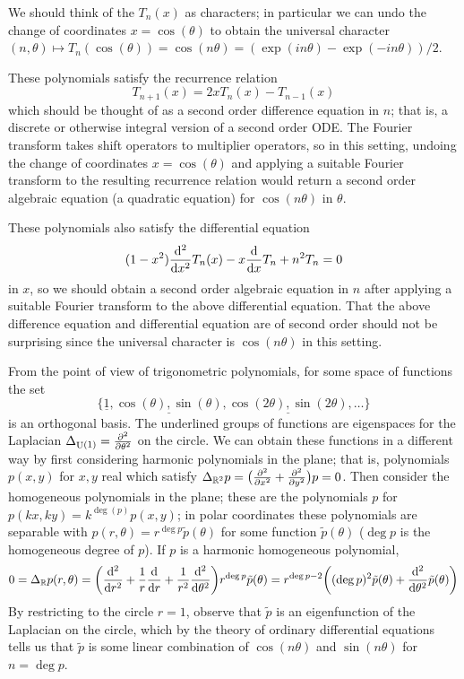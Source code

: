 \documentclass[11pt,leqno]{article}
\theoremstyle{plain}
\theoremstyle{definition}
\numberwithin{equation}{section}
\numberwithin{lem}{section}
\DeclareMathOperator{\U}{U}
\begin{document}
We should think of the $T_n(x)$ as characters; in particular we can undo the change of coordinates $x = \cos(\theta)$ to obtain the universal character $(n,\theta)\mapsto T_n(\cos(\theta)) = \cos(n\theta) = (\exp(in\theta)-\exp(-in\theta))/2$.

These polynomials satisfy the recurrence relation
\[T_{n+1}(x) = 2xT_n(x) - T_{n-1}(x)\]
which should be thought of as a second order difference equation in $n$; that is, a discrete or otherwise integral version of a second order ODE. The Fourier transform takes shift operators to multiplier operators, so in this setting, undoing the change of coordinates $x = \cos(\theta)$ and applying a suitable Fourier transform to the resulting recurrence relation would return a second order algebraic equation (a quadratic equation) for $\cos(n\theta)$ in $\theta$.

These polynomials also satisfy the differential equation
\[(1-x^2)\dv[2]{x}T_n(x)-x\dv{x}T_n+ n^2T_n = 0\]
in $x$, so we should obtain a second order algebraic equation in $n$ after applying a suitable Fourier transform to the above differential equation. That the above difference equation and differential equation are of second order should not be surprising since the universal character is $\cos(n\theta)$ in this setting.

From the point of view of trigonometric polynomials, for some space of functions the set
\[\{\underline{1},\underline{\cos(\theta), \sin(\theta)}, \underline{\cos(2\theta),\sin(2\theta)},\dots\}\]
is an orthogonal basis. The underlined groups of functions are eigenspaces for the Laplacian $\Delta_{\U(1)} = \pdv[2]{\theta}$ on the circle. We can obtain these functions in a different way by first considering harmonic polynomials in the plane; that is, polynomials $p(x,y)$ for $x,y$ real which satisfy $\Delta_{\mathbb R^2}p = \bigl(\pdv[2]{x} + \pdv[2]{y}\bigr)p = 0$. Then consider the homogeneous polynomials in the plane; these are the polynomials $p$ for $p(kx,ky) = k^{\deg(p)}p(x,y)$; in polar coordinates these polynomials are separable with $p(r,\theta) = r^{\deg p}\tilde p(\theta)$ for some function $\tilde p(\theta)$ ($\deg p$ is the homogeneous degree of $p$). If $p$ is a harmonic homogeneous polynomial,
\[0 = \Delta_{\mathbb R}p(r,\theta) = \biggl(\dv[2]{r}+\frac{1}{r}\dv{r}+\frac{1}{r^2}\dv[2]{\theta}\biggr)r^{\deg p}\tilde p(\theta) = r^{\deg p - 2}\biggl((\deg p)^2\tilde p(\theta)+\dv[2]{\theta}\tilde p(\theta)\biggr)\]
By restricting to the circle $r = 1$, observe that $\tilde p$ is an eigenfunction of the Laplacian on the circle, which by the theory of ordinary differential equations tells us that $\tilde p$ is some linear combination of $\cos(n\theta)$ and $\sin(n\theta)$ for $n = \deg p$.
\end{document}
